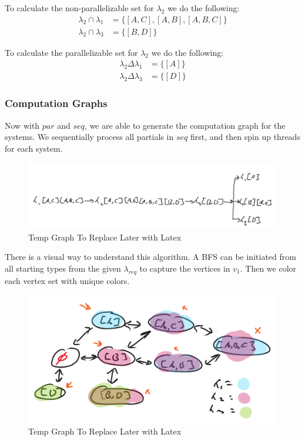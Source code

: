 To calculate the non-parallelizable set for $\lambda_2$ we do the following:
\begin{align*}
\lambda_2 \cap \lambda_1 &= \{[A,C],[A,B],[A,B,C]\} \\
\lambda_2 \cap \lambda_3 &= \{[B,D]\}    
\end{align*}

To calculate the parallelizable set for $\lambda_2$ we do the following:
\begin{align*}
\lambda_2 \Delta \lambda_1 &= \{[A]\} \\    
\lambda_2 \Delta \lambda_3 &= \{[D]\}    
\end{align*}


\subsubsection{Computation Graphs}
Now with $par$ and $seq$, we are able to generate the computation graph for the systems. We sequentially process all partials in $seq$ first, and then spin up threads for each system. 

\begin{figure}[H]
    \centering
    \includegraphics[width=0.5\linewidth]{resources/computation_graph.png}
    \caption{Temp Graph To Replace Later with Latex}
    \label{fig:temp1}
\end{figure}

There is a visual way to understand this algorithm. A BFS can be initiated from all starting types from the given $\lambda_{req}$ to capture the vertices in $v_1$. Then we color each vertex set with unique colors. 

\begin{figure}[H]
    \centering
    \includegraphics[width=0.5\linewidth]{resources/color_graph.png}
    \caption{Temp Graph To Replace Later with Latex}
    \label{fig:graph2}
\end{figure}

